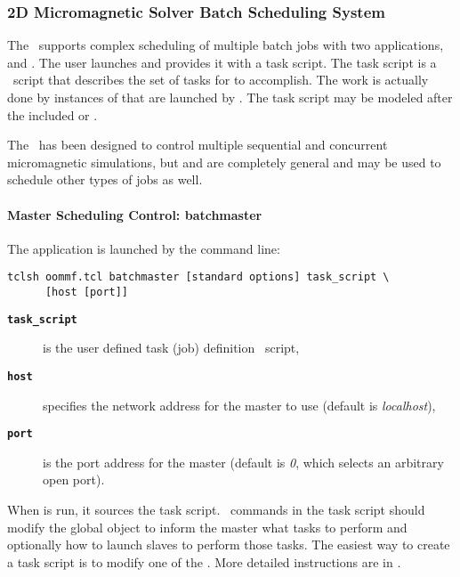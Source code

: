 \subsubsection{2D Micromagnetic Solver Batch Scheduling System}

The \OBS\ supports complex scheduling of multiple batch jobs
with two applications,  and .
The user launches  and provides it with
a task script.  The task script is a
\Tcl\ script that describes the set of tasks for 
to accomplish.  The work is actually done by instances of
 that are launched by .
The task script may be
modeled after the included {} or {}
.

The \OBS\ has been designed to control multiple sequential and
concurrent micromagnetic simulations, but 
 and  are completely general
and may be used to schedule other types of jobs as well.

\paragraph{Master Scheduling Control: batchmaster}\par
The application  is
launched by the command line:
\begin{verbatim}
tclsh oommf.tcl batchmaster [standard options] task_script \
      [host [port]]
\end{verbatim}
\begin{description}
\item[{\tt\bf task\_script}]
  is the user defined task (job) definition \Tcl\ script,
\item[{\tt\bf host}]
  specifies the network address for the master to use (default is {\em
  localhost}),
\item[{\tt\bf port}]
  is the port address for the master (default is {\em 0}, which
  selects an arbitrary open port).
\end{description}

When  is run, it
sources the task script.  \Tcl\ commands in the task script
should modify the global object 
to inform the master what tasks to perform and
optionally how to launch slaves to perform those tasks.  
The easiest way to create a task script is to modify one of the 
.  More detailed instructions are in
.

